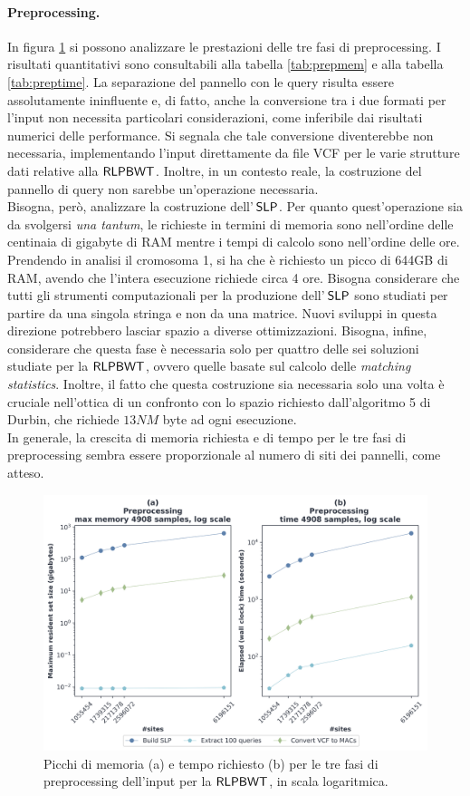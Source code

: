 \paragraph{Preprocessing.}
In figura \ref{fig:prechr} si possono analizzare le prestazioni delle tre
fasi di preprocessing. I risultati quantitativi sono consultabili alla tabella
\ref{tab:prepmem} e alla tabella \ref{tab:preptime}. La separazione del
pannello con le query risulta essere assolutamente 
ininfluente e, di fatto, anche la conversione tra i due formati per l'input non
necessita particolari considerazioni, come inferibile dai risultati numerici
delle performance. Si segnala che tale conversione 
diventerebbe non necessaria, implementando l'input direttamente da file VCF per
le varie strutture dati relative alla $\mbox{\rm {\sf RLPBWT}}$. Inoltre, in un contesto
reale, la costruzione del pannello di query non sarebbe un'operazione
necessaria.\\
Bisogna, però, analizzare la costruzione 
dell'$\,\mbox{\rm {\sf SLP}}$. Per quanto quest'operazione sia da svolgersi \textit{una
  tantum}, le richieste in termini di memoria sono nell'ordine delle centinaia
di gigabyte di RAM mentre i tempi di calcolo sono nell'ordine delle
ore. Prendendo in analisi il cromosoma 1, si ha che è richiesto un picco
di 644GB di RAM, avendo che l'intera esecuzione richiede circa 4 ore.
Bisogna considerare che tutti gli strumenti computazionali per la
produzione 
dell'$\,\mbox{\rm {\sf SLP}}$ sono studiati per partire da una singola stringa e non da una
matrice. Nuovi sviluppi in questa direzione potrebbero lasciar spazio a diverse
ottimizzazioni. Bisogna, infine, considerare che
questa fase è necessaria solo per quattro delle sei soluzioni studiate per la
$\mbox{\rm {\sf RLPBWT}}$, ovvero quelle basate sul calcolo delle \textit{matching statistics}.
Inoltre, il fatto che questa costruzione sia necessaria solo una volta 
è cruciale nell'ottica di un confronto con
lo spazio richiesto dall'algoritmo 5 di Durbin, che richiede $13NM$
byte ad ogni esecuzione.\\
In generale, la crescita di memoria richiesta e di tempo per le tre fasi di
preprocessing sembra essere proporzionale al numero di siti dei pannelli, come
atteso.
\begin{figure}
  \centering
  \includegraphics[width=\linewidth]{img/prep_mem_time.png}
  \caption{Picchi di memoria (a) e tempo richiesto (b) per le tre fasi di
    preprocessing dell'input per la $\mbox{\rm {\sf RLPBWT}}$, in scala logaritmica.}
  \label{fig:prechr}
\end{figure}
